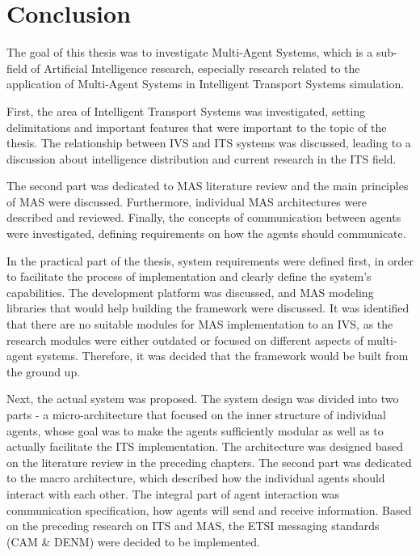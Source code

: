 \documentclass[titlepage, 12pt]{article}
\begin{document}
















\clearpage

\section{Conclusion}

The goal of this thesis was to investigate Multi-Agent Systems, which is a sub-field of Artificial Intelligence 
research, especially research related to the application of Multi-Agent Systems in Intelligent Transport Systems 
simulation. 

First, the area of Intelligent Transport Systems was investigated, setting delimitations and important features 
that were important to the topic of the thesis. The relationship between IVS and ITS systems was discussed, leading 
to a discussion about intelligence distribution and current research in the ITS field. 

The second part was dedicated to MAS literature review and the main principles of MAS were discussed. Furthermore, 
individual MAS architectures were described and reviewed. Finally, the concepts of communication between agents were investigated,
defining requirements on how the agents should communicate. 

In the practical part of the thesis, system requirements were defined first, in order to facilitate the 
process of implementation and clearly define the system's capabilities. The development platform was discussed, 
and MAS modeling libraries that would help building the framework were discussed. It was identified that 
there are no suitable modules for MAS implementation to an IVS, as the research modules were either outdated or focused on 
different aspects of multi-agent systems. Therefore, it was decided that the framework would be built from the ground up.

Next, the actual system was proposed. The system design was divided into two parts - a
micro-architecture that focused on the inner structure of individual agents, whose goal was to
make the agents sufficiently modular as well as to actually facilitate the ITS implementation.
The architecture was designed based on the literature review in the preceding chapters. The
second part was dedicated to the macro architecture, which described how the individual agents
should interact with each other. The integral part of agent interaction was communication
specification, how agents will send and receive information.  Based on the preceding research
on ITS and MAS, the ETSI messaging standards (CAM \& DENM) were decided to be implemented.
\end{document}

